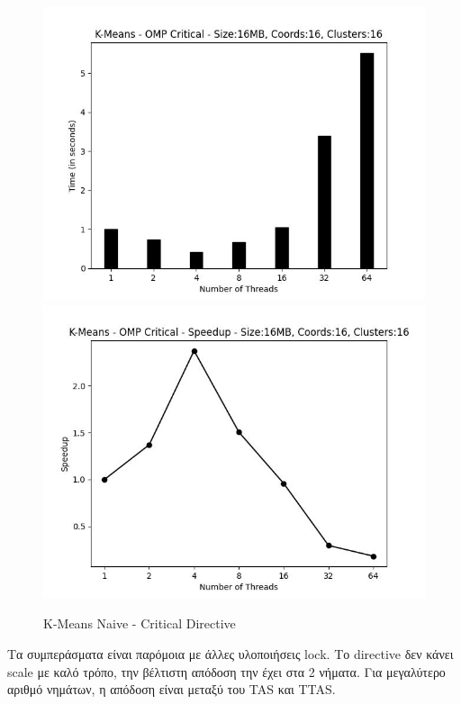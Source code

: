 \documentclass[../final_report.tex]{subfiles}
\begin{document}
\begin{figure}[H]
    \centering
        \includegraphics[scale=0.48]{outFilesAffinityMouliko/plots/kmeans_locks_critical.jpg}
        \includegraphics[scale=0.48]{outFilesAffinityMouliko/plots/kmeans_locks_critical_speedup.jpg}
    \caption{K-Means Naive - Critical Directive}
    \label{fig:K-Means Naive - Critical Directive}
\end{figure}

Τα συμπεράσματα είναι παρόμοια με άλλες υλοποιήσεις lock. Το directive δεν κάνει scale με καλό τρόπο, την 
βέλτιστη απόδοση την έχει στα 2 νήματα. Για μεγαλύτερο αριθμό νημάτων, η απόδοση είναι μεταξύ του TAS και TTAS.
\end{document}
